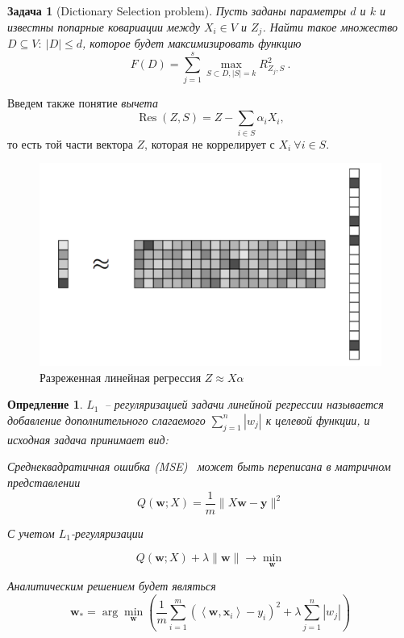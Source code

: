 \documentclass[preprint,12pt]{elsarticle}
\newtheorem{definition}{Опредление}
\newtheorem{problem}{Задача}
\begin{document}
\begin{problem}[Dictionary Selection problem]
Пусть заданы параметры $d$ и $k$ и известны попарные ковариации между $X_i \in V$ и $Z_j$. Найти такое множество $D \subseteq V:~|D|\leqslant d$, которое будет максимизировать функцию 
\[F(D)=\sum_{j=1}^{s} \max _{S \subset D,|S|=k} R_{Z_{j}, S}^{2}~.\]
\end{problem}

Введем также понятие \textit{вычета}
\[\operatorname{Res}(Z, S)=Z-\sum\limits_{i \in S} \alpha_{i} X_{i},\]
то есть той части вектора $Z$, которая не коррелирует с $X_i~\forall i\in S$.

\begin{figure}[h]
\centering\includegraphics[width=0.6\linewidth]{Screenshot_1.png}
\caption{Разреженная линейная регрессия $Z\approx X\alpha$}
\end{figure}

\begin{definition}
\label{L1}
$L_1$~-- регуляризацией задачи линейной регрессии \cite{montgomery2012introduction} называется добавление дополнительного слагаемого $\sum\limits_{j = 1}^n |w_j|$ к целевой функции, и исходная задача принимает вид: 

Среднеквадратичная ошибка (MSE)~\cite{montgomery2012introduction} может быть переписана в матричном представлении 
$$Q(\mathbf{w} ; X)=\frac{1}{m}\|X \mathbf{w}-\boldsymbol{y}\|^{2}$$

С учетом $L_1$-регуляризации 

$$Q(\mathbf{w} ; X)+\lambda\|\mathbf{w}\| \rightarrow \min _{\mathbf{w}} $$

Аналитическим решением будет являться
$$\mathbf{w}_{*}=\arg \min _{\mathbf{w}}\left(\frac{1}{m} \sum_{i=1}^{m}\left(\left\langle\mathbf{w}, \mathbf{x}_{i}\right\rangle-y_{i}\right)^{2}+\lambda \sum_{j=1}^{n}\left|w_{j}\right|\right)$$

\end{definition}
\end{document}
